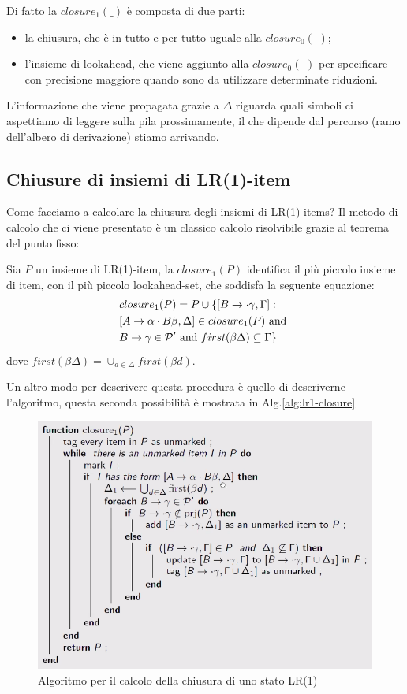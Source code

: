 \documentclass[class=book, crop=false, oneside, 12pt]{standalone}
\begin{document}
Di fatto la \(closure_1(\_)\) è composta di due parti:
\begin{itemize}
    \item la chiusura, che è in tutto e per tutto uguale alla \(closure_0(\_)\);
    \item l'insieme di lookahead, che viene aggiunto alla \(closure_0(\_)\) per specificare con precisione maggiore quando sono da utilizzare determinate riduzioni.  
\end{itemize}
L'informazione che viene propagata grazie a \(\Delta\) riguarda quali simboli ci aspettiamo di leggere sulla pila prossimamente, il che dipende dal percorso (ramo dell'albero di derivazione) stiamo arrivando.

\subsection{Chiusure di insiemi di LR(1)-item}
Come facciamo a calcolare la chiusura degli insiemi di LR(1)-items? Il metodo di calcolo che ci viene presentato è un classico calcolo risolvibile grazie al teorema del punto fisso:
\begin{definition}
    \label{def:lr1-closure}
    Sia \(P\) un insieme di LR(1)-item, la \(closure_1(P)\) identifica il più piccolo insieme di item, con il più piccolo lookahead-set, che soddisfa la seguente equazione:
    \begin{align*}
        &closure_1(P) = P \cup \{[B \rightarrow \cdot \gamma, \Gamma] : \\
        &[A \rightarrow \alpha \cdot B \beta, \Delta] \in closure_1(P) \textrm{ and } \\ 
        &B \rightarrow \gamma \in \P' \textrm{ and } first(\beta \Delta) \subseteq \Gamma\}
    \end{align*}  
    dove \(first(\beta \Delta) = \cup_{d \in \Delta} first(\beta d)\).
\end{definition}
Un altro modo per descrivere questa procedura è quello di descriverne l'algoritmo, questa seconda possibilità è mostrata in Alg.\ref{alg:lr1-closure}
\begin{figure}[H]
    \centering
    \includegraphics[width=\textwidth,keepaspectratio]{alg_closure-lr1.png}
    \caption{Algoritmo per il calcolo della chiusura di uno stato LR(1)}
    \label{alg:closure-lr1}
\end{figure}
\end{document}
